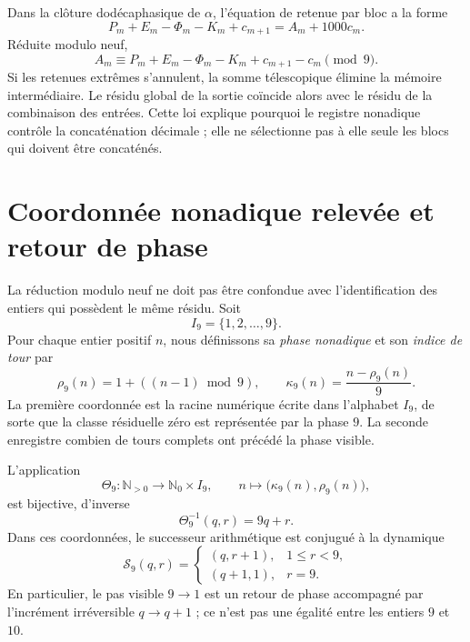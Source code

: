Dans la clôture dodécaphasique de \(\alpha\), l'équation de retenue par bloc
a la forme
\[
 P_m+E_m-\Phi_m-K_m+c_{m+1}=A_m+1000c_m.
\]
Réduite modulo neuf,
\[
 A_m\equiv
 P_m+E_m-\Phi_m-K_m+c_{m+1}-c_m
 \pmod9.
\]
Si les retenues extrêmes s'annulent, la somme télescopique élimine la mémoire
intermédiaire. Le résidu global de la sortie coïncide alors avec le résidu
de la combinaison des entrées. Cette loi explique pourquoi le registre nonadique
contrôle la concaténation décimale ; elle ne sélectionne pas à elle seule les blocs qui
doivent être concaténés.

\section{Coordonnée nonadique relevée et retour de phase}

La réduction modulo neuf ne doit pas être confondue avec l'identification des
entiers qui possèdent le même résidu. Soit
\[
 I_9=\{1,2,\ldots,9\}.
\]
Pour chaque entier positif \(n\), nous définissons sa \emph{phase nonadique} et son
\emph{indice de tour} par
\begin{equation}
 \rho_9(n)=1+((n-1)\bmod9),
 \qquad
 \kappa_9(n)=\frac{n-\rho_9(n)}9.
 \label{eq:coordenada-nonadica-levantada}
\end{equation}
La première coordonnée est la racine numérique écrite dans l'alphabet
\(I_9\), de sorte que la classe résiduelle zéro est représentée par la phase \(9\).
La seconde enregistre combien de tours complets ont précédé la phase
visible.

\begin{theorem}
\label{thm:descomposicion-nonadica-memoria}
L'application
\[
 \Theta_9:\mathbb N_{>0}\longrightarrow\mathbb N_0\times I_9,
 \qquad
 n\longmapsto\bigl(\kappa_9(n),\rho_9(n)\bigr),
\]
est bijective, d’inverse
\[
 \Theta_9^{-1}(q,r)=9q+r.
\]
Dans ces coordonnées, le successeur arithmétique est conjugué à la dynamique
\begin{equation}
 \mathcal S_9(q,r)=
 \begin{cases}
  (q,r+1),&1\leq r<9,\\
  (q+1,1),&r=9.
 \end{cases}
 \label{eq:sucesor-nonadico-levantado}
\end{equation}
En particulier, le pas visible \(9\to1\) est un retour de phase accompagné
par l'incrément irréversible \(q\to q+1\) ; ce n'est pas une égalité entre les
entiers \(9\) et \(10\).
\end{theorem}

